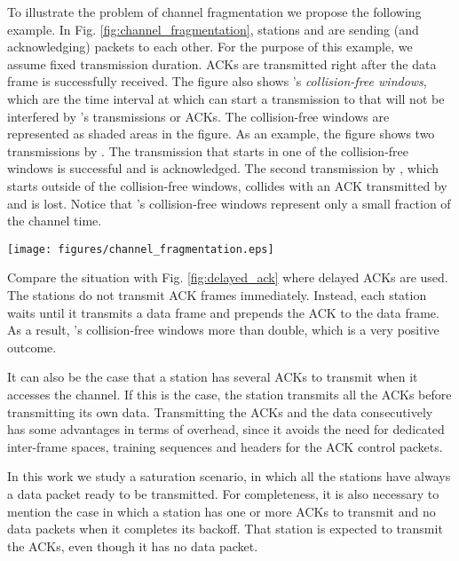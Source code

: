 \documentclass[twocolumn]{svjour3}          \smartqed  \usepackage{graphicx}
\begin{document}
To illustrate the problem of channel fragmentation we propose the following example.
In Fig. \ref{fig:channel_fragmentation}, stations  and  are sending (and acknowledging) packets to each other.
For the purpose of this example, we assume fixed transmission duration.
ACKs are transmitted right after the data frame is successfully received.
The figure also shows 's \emph{collision-free windows}, which are the time interval at which  can start a transmission to  that will not be interfered by 's transmissions or ACKs.
The collision-free windows are represented as shaded areas in the figure.
As an example, the figure shows two transmissions by .
The transmission that starts in one of the collision-free windows is successful and is acknowledged.
The second transmission by , which starts outside of the collision-free windows, collides with an ACK transmitted by  and is lost.
Notice that 's collision-free windows represent only a small fraction of the channel time.



\begin{figure*}
\centering
  \texttt{[image: figures/channel\_fragmentation.eps]}
\caption{'s collision-free windows are those intervals at which  can start a transmission to  without being interfered by 's transmissions or ACKs. In the figure, collision-free windows are represented as a shaded area.}
\label{fig:channel_fragmentation}
\end{figure*}

Compare the situation with Fig. \ref{fig:delayed_ack} where delayed ACKs are used.
The stations do not transmit ACK frames immediately.
Instead, each station waits until it transmits a data frame and prepends the ACK to the data frame.
As a result, 's collision-free windows more than double, which is a very positive outcome.

It can also be the case that a station has several ACKs to transmit when it accesses the channel.
If this is the case, the station transmits all the ACKs before transmitting its own data.
Transmitting the ACKs and the data consecutively has some advantages in terms of overhead, since it avoids the need for dedicated inter-frame spaces, training sequences and headers for the ACK control packets.

In this work we study a saturation scenario, in which all the stations have always a data packet ready to be transmitted.
For completeness, it is also necessary to mention the case in which a station has one or more ACKs to transmit and no data packets when it completes its backoff.
That station is expected to transmit the ACKs, even though it has no data packet.
\end{document}
